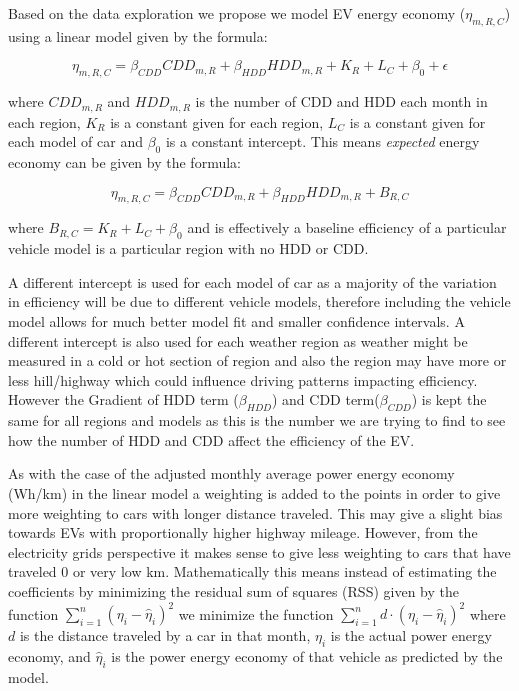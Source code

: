 \documentclass[
]{article}
\begin{document}
Based on the data exploration we propose we model EV energy economy
(\(\eta_{m,R,C}\)) using a linear model given by the formula:

\begin{equation}
\label{eq:linear_model}
\eta_{m,R,C} = \beta_{CDD}{CDD}_{m,R} + \beta_{HDD}{HDD}_{m,R} + K_R + L_C + \beta_0 + \epsilon
\end{equation}

where \({CDD}_{m,R}\) and \({HDD}_{m,R}\) is the number of CDD and HDD
each month in each region, \(K_R\) is a constant given for each region,
\(L_C\) is a constant given for each model of car and \(\beta_0\) is a
constant intercept. This means \emph{expected} energy economy can be
given by the formula:

\begin{equation}
\label{eq:economy_model}
\eta_{m,R,C} = \beta_{CDD}{CDD}_{m,R} + \beta_{HDD}{HDD}_{m,R} + B_{R,C}
\end{equation}

where \(B_{R,C} = K_R + L_C + \beta_0\) and is effectively a baseline
efficiency of a particular vehicle model is a particular region with no
HDD or CDD.

A different intercept is used for each model of car as a majority of the
variation in efficiency will be due to different vehicle models,
therefore including the vehicle model allows for much better model fit
and smaller confidence intervals. A different intercept is also used for
each weather region as weather might be measured in a cold or hot
section of region and also the region may have more or less hill/highway
which could influence driving patterns impacting efficiency. However the
Gradient of HDD term (\(\beta_{HDD}\)) and CDD term(\(\beta_{CDD}\)) is
kept the same for all regions and models as this is the number we are
trying to find to see how the number of HDD and CDD affect the
efficiency of the EV.

As with the case of the adjusted monthly average power energy economy
(Wh/km) in the linear model a weighting is added to the points in order
to give more weighting to cars with longer distance traveled. This may
give a slight bias towards EVs with proportionally higher highway
mileage. However, from the electricity grids perspective it makes sense
to give less weighting to cars that have traveled 0 or very low km.
Mathematically this means instead of estimating the coefficients by
minimizing the residual sum of squares (RSS) given by the function
\(\sum_{i =1}^{n}(\eta_{i}-\hat{\eta}_{i})^2\) we minimize the function
\(\sum_{i =1}^{n}d \cdot(\eta_{i}-\hat{\eta}_{i})^2\) where \(d\) is the
distance traveled by a car in that month, \(\eta_{i}\) is the actual
power energy economy, and \(\hat{\eta}_{i}\) is the power energy economy
of that vehicle as predicted by the model.
\end{document}
